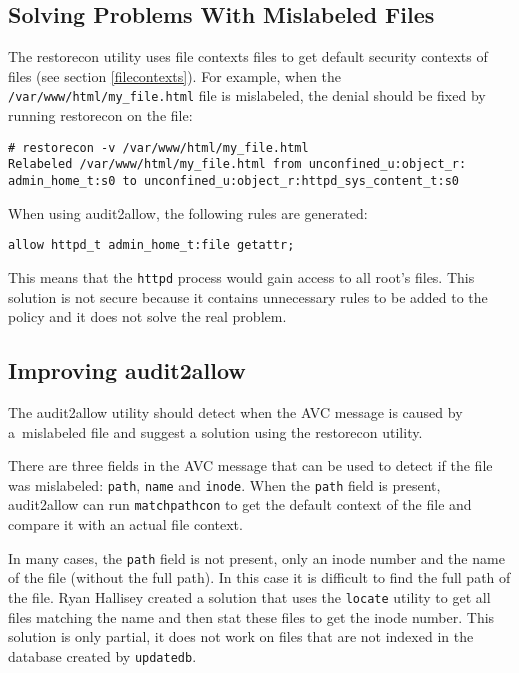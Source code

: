 \subsection{Solving Problems With Mislabeled Files}
The restorecon utility uses file contexts files to get default security contexts
of files (see section \ref{filecontexts}). For example, when the
\texttt{/var/www/html/my\_file.html} file is mislabeled, the denial should be
fixed by running restorecon on the file:
\begin{lstlisting}
# restorecon -v /var/www/html/my_file.html
Relabeled /var/www/html/my_file.html from unconfined_u:object_r:
admin_home_t:s0 to unconfined_u:object_r:httpd_sys_content_t:s0
\end{lstlisting}

When using audit2allow, the following rules are generated:
\begin{lstlisting}
allow httpd_t admin_home_t:file getattr;
\end{lstlisting}
This means that the \texttt{httpd} process would gain access to all root's
files. This solution is not secure because it contains unnecessary rules to be
added to the policy and it does not solve the real problem.

\subsection{Improving audit2allow}
The audit2allow utility should detect when the AVC message is caused by
a~mislabeled file and suggest a solution using the restorecon utility.

There are three fields in the AVC message that can be used to detect if the file
was mislabeled: \texttt{path}, \texttt{name} and \texttt{inode}. When the
\texttt{path} field is present, audit2allow can run \texttt{matchpathcon} to get
the default context of the file and compare it with an actual file context.

In many cases, the \texttt{path} field is not present, only an inode number and
the name of the file (without the full path). In this case it is difficult to
find the full path of the file. Ryan Hallisey created a solution
\cite{restoreconpullreq} that uses the \texttt{locate} utility to get all files
matching the name and then stat these files to get the inode number. This
solution is only partial, it does not work on files that are not indexed in the
database created by \texttt{updatedb}.

